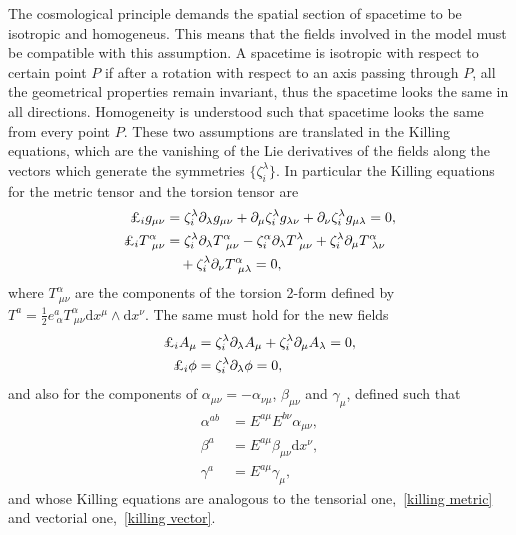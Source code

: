 \documentclass[aps,prd,12pt,superscriptaddress,showpacs,showkeys,longbibliography,reprint,nofootinbib]{revtex4-1}
\begin{document}
The cosmological principle demands the spatial section of spacetime to be isotropic and homogeneus. This means that the fields involved in the model must be compatible with this assumption. A spacetime is isotropic with respect to certain point $P$ if after a rotation with respect to an axis passing through $P$, all the geometrical properties remain invariant, thus the spacetime looks the same in all directions. Homogeneity is understood such that spacetime looks the same from every point $P$. These two assumptions are translated in the Killing equations, which are the vanishing of the Lie derivatives of the fields along the vectors which generate the symmetries $\{\zeta^\lambda_{i}\}$. In particular the Killing equations for the metric tensor and the torsion tensor are
\begin{align}
  \label{killing metric}
  \text{\textsterling}_i g_{\mu\nu}&=\zeta^\lambda_i\partial_\lambda g_{\mu\nu}+\partial_\mu\zeta^\lambda_i g_{\lambda\nu}+\partial_\nu\zeta^\lambda_i g_{\mu\lambda}=0,\\
  \text{\textsterling}_i T^\alpha_{\ \mu\nu}&=\zeta^\lambda_i\partial_\lambda T^\alpha_{\ \mu\nu}-\zeta^\alpha_i\partial_\lambda T^\lambda_{\ \mu\nu}
  +\zeta^\lambda_i\partial_\mu T^\alpha_{\ \lambda\nu}\notag\\
  &\quad +\zeta^\lambda_i\partial_\nu T^\alpha_{\ \mu\lambda}=0,
\end{align}
where $T^\alpha_{\ \mu\nu}$ are the components of the torsion 2-form defined by $T^a=\frac{1}{2}e^a_{\ \alpha}T^\alpha_{\ \mu\nu}\mbox{d}x^\mu\wedge\mbox{d}x^\nu$. The same must hold for the new fields
\begin{align}
  \label{killing vector}
  \text{\textsterling}_i A_\mu&=\zeta^\lambda_i\partial_\lambda A_\mu+\zeta^\lambda_i\partial_\mu A_\lambda=0,\\
  \text{\textsterling}_i \phi &=\zeta^\lambda_i\partial_\lambda\phi=0,
\end{align}
and also for the components of $\alpha_{\mu\nu}=-\alpha_{\nu\mu}$, $\beta_{\mu\nu}$ and $\gamma_\mu$, defined such that
\begin{align*}
  \alpha^{ab}&=E^{a\mu}E^{b\nu}\alpha_{\mu\nu},\\
  \beta^a&=E^{a\mu}\beta_{\mu\nu}\mbox{d}x^\nu,\\
  \gamma^a&=E^{a\mu}\gamma_\mu,
\end{align*} 
and whose Killing equations are analogous to the tensorial one,~\eqref{killing metric} and vectorial one,~\eqref{killing vector}.
\end{document}
